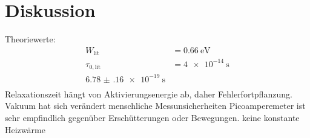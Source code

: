 \section{Diskussion}
\label{sec:Diskussion}

Theoriewerte\cite{RMucillo}: 
\begin{align*}
    W_\text{lit}&= \qty{0.66}{\electronvolt}\\
    \tau_{0,\text{lit}}&= \qty{4e-14}{\second}\\ 
    \SI{6.78(16)e-19}{\s}\\
\end{align*}
Relaxationszeit hängt von Aktivierungsenergie ab, daher Fehlerfortpflanzung.
Vakuum hat sich verändert
menschliche Messunsicherheiten
Picoamperemeter ist sehr empfindlich gegenüber Erschütterungen oder Bewegungen.
keine konstante Heizwärme